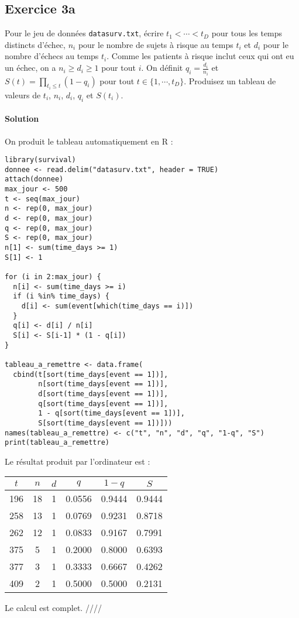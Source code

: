 \documentclass[../main.tex]{subfiles}
\begin{document}
\begin{CJK*}{UTF8}{gbsn}
\section*{Exercice 3a}
Pour le jeu de données 
\texttt{datasurv.txt}, 
écrire $t_1 < \cdots < t_D$ pour tous les temps distincts d'échec, 
$n_i$ pour le nombre de sujets à risque au temps $t_i$
et $d_i$ pour le nombre d'échecs au temps $t_i$.
Comme les patients à risque inclut ceux qui ont eu un échec,
on a $n_i \geqslant d_i \geqslant 1$ pour tout $i$.
On définit $q_i = \frac{d_i}{n_i}$ et $S(t) = \prod_{t_i \leqslant t} (1 - q_i)$
pour tout $t \in \{1, \cdots, t_D\}$.
Produisez un tableau de valeurs de $t_i$, $n_i$, $d_i$, $q_i$ et $S(t_i)$.

\smallskip
\paragraph{Solution}

On produit le tableau automatiquement en R :

\begin{lstlisting}
library(survival)
donnee <- read.delim("datasurv.txt", header = TRUE)
attach(donnee)
max_jour <- 500
t <- seq(max_jour)
n <- rep(0, max_jour)
d <- rep(0, max_jour)
q <- rep(0, max_jour)
S <- rep(0, max_jour)
n[1] <- sum(time_days >= 1)
S[1] <- 1

for (i in 2:max_jour) {
  n[i] <- sum(time_days >= i)
  if (i %in% time_days) {
    d[i] <- sum(event[which(time_days == i)])
  } 
  q[i] <- d[i] / n[i]
  S[i] <- S[i-1] * (1 - q[i])
}

tableau_a_remettre <- data.frame(
  cbind(t[sort(time_days[event == 1])], 
        n[sort(time_days[event == 1])], 
        d[sort(time_days[event == 1])], 
        q[sort(time_days[event == 1])],
        1 - q[sort(time_days[event == 1])],
        S[sort(time_days[event == 1])]))
names(tableau_a_remettre) <- c("t", "n", "d", "q", "1-q", "S")
print(tableau_a_remettre)
\end{lstlisting}

Le résultat produit par l'ordinateur est :

\begin{center}
\begin{tabular}{|c|c|c|c|c|c|}
\hline
$t$ & $n$ & $d$ & $q$ & $1-q$ & $S$ \\ \hline
196 & 18 & 1 & 0.0556 & 0.9444 & 0.9444 \\ \hline
258 & 13 & 1 & 0.0769 & 0.9231 & 0.8718 \\ \hline
262 & 12 & 1 & 0.0833 & 0.9167 & 0.7991 \\ \hline
375 & 5 & 1 & 0.2000 & 0.8000 & 0.6393 \\ \hline
377 & 3 & 1 & 0.3333 & 0.6667 & 0.4262 \\ \hline
409 & 2 & 1 & 0.5000 & 0.5000 & 0.2131 \\ \hline
\end{tabular}
\end{center}

Le calcul est complet. ////

\end{CJK*}
\end{document}
